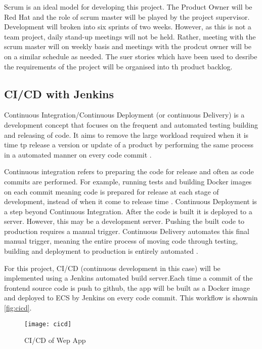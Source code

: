 	Scrum is an ideal model for developing this project. The Product Owner will be Red Hat and the role of scrum master will be played by the project supervisor. Development will broken into six sprints of two weeks. However, as this is not a team project, daily stand-up meetings will not be held. Rather, meeting with the scrum master will on weekly basis and meetings with the prodcut owner will be on a similar schedule as needed. The suer stories which have been used to desribe the requirements of the project will be organised into th product backlog.
	
	\subsection{CI/CD with Jenkins}
	Continuous Integration/Continuous Deployment (or continuous Delivery) is a development concept that focuses on the frequent and automated testing building and releasing of code. It aims to remove the large workload required when it is time tp release a version or update of a product by performing the same process in a automated manner on every code commit \citep{pittet}.
	
	Continuous integration refers to preparing the code for release and often as code commits are performed. For example, running tests and building Docker images on each commit meaning code is prepared for release at each stage of development, instead of when it come to release time \citep{ramos}.
	Continuous Deployment is a step beyond Continuous Integration. After the code is built it is deployed to a server. However, this may be a development server. Pushing the built code to production requires a manual trigger. Continuous Delivery automates this final manual trigger, meaning the entire process of moving code through testing, building and deployment to production is entirely automated \citep{ellingwood}.
	
	For this project, CI/CD (continuous development in this case) will be implemented using a Jenkins automated build server.Each time a commit of the frontend source code is push to github, the app will be built as a Docker image and deployed to ECS by Jenkins on every code commit. This workflow is shownin \autoref{fig:cicd}.
	
	\begin{figure}[H]
		\setlength{\belowcaptionskip}{15pt plus 3pt minus 2pt}
		\caption{CI/CD of Wep App}
		\centering
		\texttt{[image: cicd]}
		\label{fig:cicd}
	\end{figure}
	
